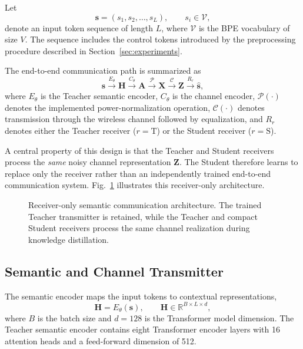 \documentclass[conference]{IEEEtran}
\begin{document}
Let
\begin{equation}
    \mathbf{s}=(s_1,s_2,\ldots,s_L), \qquad s_i\in\mathcal{V},
\end{equation}
denote an input token sequence of length $L$, where $\mathcal{V}$ is the BPE vocabulary of size $V$. The sequence includes the control tokens introduced by the preprocessing procedure described in Section~\ref{sec:experiments}.

The end-to-end communication path is summarized as
\begin{equation}
\mathbf{s}
\xrightarrow{E_{\theta}}
\mathbf{H}
\xrightarrow{C_{\theta}}
\mathbf{A}
\xrightarrow{\mathcal{P}}
\mathbf{X}
\xrightarrow{\mathcal{C}}
\mathbf{Z}
\xrightarrow{R_r}
\widehat{\mathbf{s}},
\label{eq:system-overview}
\end{equation}
where $E_{\theta}$ is the Teacher semantic encoder, $C_{\theta}$ is the channel encoder, $\mathcal{P}(\cdot)$ denotes the implemented power-normalization operation, $\mathcal{C}(\cdot)$ denotes transmission through the wireless channel followed by equalization, and $R_r$ denotes either the Teacher receiver ($r=\mathrm{T}$) or the Student receiver ($r=\mathrm{S}$).

A central property of this design is that the Teacher and Student receivers process the \emph{same} noisy channel representation $\mathbf{Z}$. The Student therefore learns to replace only the receiver rather than an independently trained end-to-end communication system. Fig.~\ref{fig:system} illustrates this receiver-only architecture.

\begin{figure}[t]
    \centering
    
    \caption{Receiver-only semantic communication architecture. The trained Teacher transmitter is retained, while the Teacher and compact Student receivers process the same channel realization during knowledge distillation.}
    \label{fig:system}
\end{figure}

\subsection{Semantic and Channel Transmitter}
The semantic encoder maps the input tokens to contextual representations,
\begin{equation}
    \mathbf{H}=E_{\theta}(\mathbf{s}),
    \qquad
    \mathbf{H}\in\mathbb{R}^{B\times L\times d},
\end{equation}
where $B$ is the batch size and $d=128$ is the Transformer model dimension. The Teacher semantic encoder contains eight Transformer encoder layers with 16 attention heads and a feed-forward dimension of 512.
\end{document}
